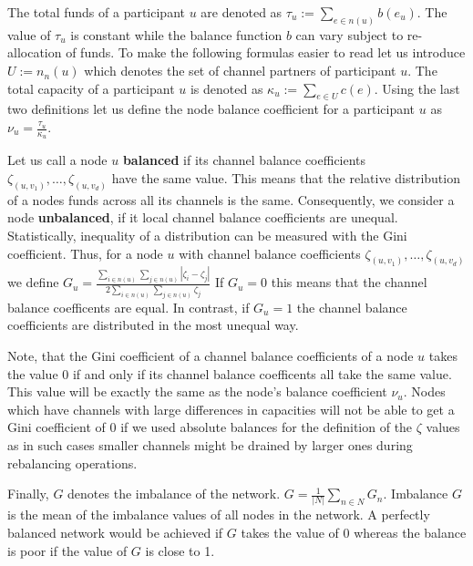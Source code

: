 \documentclass[a4paper]{paper}
\begin{document}
The total funds of a participant $u$ are denoted as $\tau_u:=\displaystyle{\sum_{e\in n(u)}b(e_u)}$.
The value of $\tau_u$ is constant while the balance function $b$ can vary subject to re-allocation of funds.
To make the following formulas easier to read let us introduce $U:=n_n(u)$ which denotes the set of channel partners of participant $u$.
The total capacity of a participant $u$ is denoted as $\kappa_u:=\displaystyle{\sum_{e\in U}c(e)}$.
Using the last two definitions let us define the node balance coefficient for a participant $u$ as $\nu_u = \frac{\tau_u}{\kappa_u}$.

Let us call a node $u$ {\bf balanced} if its channel balance coefficients $\zeta_{(u,v_1)},\dots,\zeta_{(u,v_d)}$ have the same value.
This means that the relative distribution of a nodes funds across all its channels is the same.
Consequently, we consider a node {\bf unbalanced}, if it local channel balance coefficients are unequal.
Statistically, inequality of a distribution can be measured with the Gini coefficient.
Thus, for a node $u$ with channel balance coefficients $\zeta_{(u,v_1)},\dots,\zeta_{(u,v_d)}$ we define $G_u = \frac{\displaystyle{\sum_{i\in n(u)} \sum_{j \in n(u)}} | \zeta_i - \zeta_j |}{2 \displaystyle{\sum_{i \in n(u)} \sum_{j \in n(u)} \zeta_j}}$
If $G_u = 0$ this means that the channel balance coefficents are equal.
In contrast, if $G_u = 1$ the channel balance coefficients are distributed in the most unequal way.

Note, that the Gini coefficient of a channel balance coefficients of a node $u$ takes the value $0$ if and only if its channel balance coefficents all take the same value.
This value will be exactly the same as the node's balance coefficient $\nu_u$.
Nodes which have channels with large differences in capacities will not be able to get a Gini coefficient of 0 if we used absolute balances for the definition of the $\zeta$ values as in such cases smaller channels might be drained by larger ones during rebalancing operations.

Finally, $G$ denotes the imbalance of the network. $G = \displaystyle{\frac{1}{|N|}\sum_{n\in N}G_n}$. Imbalance $G$ is the mean of the imbalance values of all nodes in the network.
A perfectly balanced network would be achieved if $G$ takes the value of $0$ whereas the balance is poor if the value of $G$ is close to 1.
\end{document}
